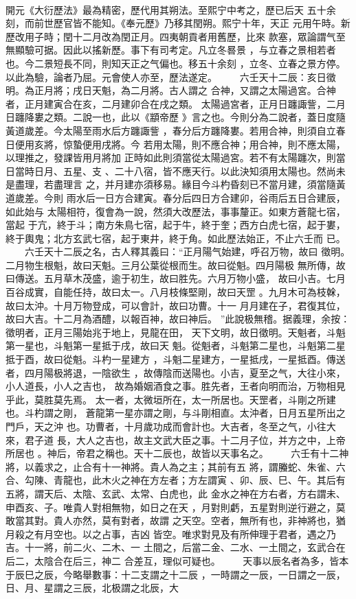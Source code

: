 \documentclass{ctexart}
\begin{document}
\paragraph{}
開元《大衍歷法》最為精密，歷代用其朔法。至熙宁中考之，歷已后天 五十余刻，而前世歷官皆不能知。《奉元歷》乃移其閏朔。熙宁十年，天正 元用午時。新歷改用子時；閏十二月改為閏正月。四夷朝貢者用舊歷，比來 款塞，眾論謂气至無顯驗可据。因此以搖新歷。事下有司考定。凡立冬晷景 ，与立春之景相若者也。今二景短長不同，則知天正之气偏也。移五十余刻 ，立冬、立春之景方停。以此為驗，論者乃屈。元會使人亦至，歷法遂定。 　　六壬天十二辰：亥日徵明。為正月將；戌日天魁，為二月將。古人謂之 合神，又謂之太陽過宮。合神者，正月建寅合在亥，二月建卯合在戌之類。 太陽過宮者，正月日躔諏訾，二月日躔降婁之類。二說一也，此以《顓帝歷 》言之也。今則分為二說者，蓋日度隨黃道歲差。今太陽至雨水后方躔諏訾 ，春分后方躔降婁。若用合神，則須自立春日便用亥將，惊蟄便用戌將。今 若用太陽，則不應合神；用合神，則不應太陽，以理推之，發課皆用月將加 正時如此則須當從太陽過宮。若不有太陽躔次，則當日當時日月、五星、支 、二十八宿，皆不應天行。以此決知須用太陽也。然尚未是盡理，若盡理言 之，并月建亦須移易。緣目今斗杓昏刻已不當月建，須當隨黃道歲差。今則 雨水后一日方合建寅。春分后四日方合建卯，谷雨后五日合建辰，如此始与 太陽相符，復會為一說，然須大改歷法，事事釐正。如東方蒼龍七宿，當起 于亢，終于斗；南方朱鳥七宿，起于牛，終于奎；西方白虎七宿，起于婁， 終于輿鬼；北方玄武七宿，起于東井，終于角。如此歷法始正，不止六壬而 已。 　　六壬天十二辰之名，古人釋其義曰：``正月陽气始建，呼召万物，故曰 徵明。二月物生根魁，故曰天魁。三月公葉從根而生。故曰從魁。四月陽极 無所傳，故曰傳送。五月草木茂盛，逾于初生，故曰胜先。六月万物小盛， 故曰小吉。七月百谷成實，自能任持，故曰太一。八月枝條堅剛，故曰天罡 。九月木可為枝榦，故曰太沖。十月万物登成，可以會計，故曰功曹。十一 月月建在子，君復其位，故曰大吉。十二月為酒醴，以報百神，故曰神后。 ''此說极無稽。据義理，余按：徵明者，正月三陽始兆于地上，見龍在田， 天下文明，故日徵明。天魁者，斗魁第一星也，斗魁第一星抵于戌，故曰天 魁。從魁者，斗魁第二星也，斗魁第二星抵于酉，故曰從魁。斗杓一星建方 ，斗魁二星建方，一星抵戌，一星抵酉。傳送者，四月陽极將退，一陰欲生 ，故傳陰而送陽也。小吉，夏至之气，大往小來，小人道長，小人之吉也， 故為婚姻酒食之事。胜先者，王者向明而治，万物相見乎此，莫胜莫先焉。 太一者，太微垣所在，太一所居也。天罡者，斗剛之所建也。斗杓謂之剛， 蒼龍第一星亦謂之剛，与斗剛相直。太沖者，日月五星所出之門戶，天之沖 也。功曹者，十月歲功成而會計也。大吉者，冬至之气，小往大來，君子道 長，大人之吉也，故主文武大臣之事。十二月子位，并方之中，上帝所居也 。神后，帝君之稱也。天十二辰也，故皆以天事名之。 　　六壬有十二神將，以義求之，止合有十一神將。貴人為之主；其前有五 將，謂螣蛇、朱雀、六合、勾陳、青龍也，此木火之神在方左者；方左謂寅 、卯、辰、巳、午。其后有五將，謂天后、太陰、玄武、太常、白虎也，此 金水之神在方右者，方右謂未、申酉亥、子。唯貴人對相無物，如日之在天 ，月對則虧，五星對則逆行避之，莫敢當其對。貴人亦然，莫有對者，故謂 之天空。空者，無所有也，非神將也，猶月殺之有月空也。以之占事，吉凶 皆空。唯求對見及有所伸理于君者，遇之乃吉。十一將，前二火、二木、一 土間之，后當二金、二水、一土間之，玄武合在后二，太陰合在后三，神二 合差互，理似可疑也。 　　天事以辰名者為多，皆本于辰巳之辰，今略舉數事：十二支謂之十二辰 ，一時謂之一辰，一日謂之一辰，日、月、星謂之三辰，北极謂之北辰，大 
\end{document}
